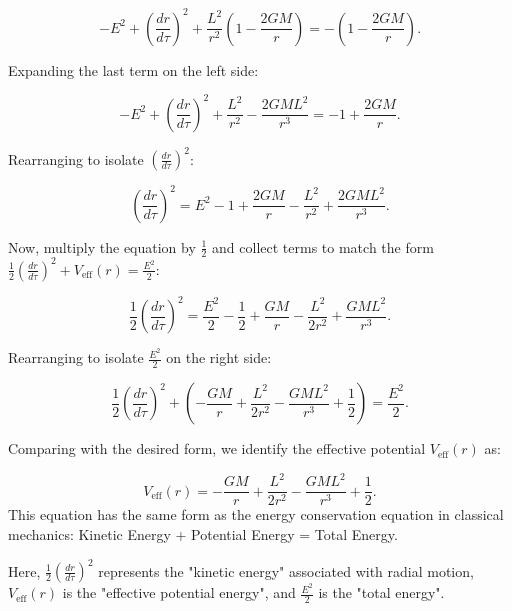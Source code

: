 \begin{equation}
-E^2 + \left( \frac{dr}{d\tau} \right)^2 + \frac{L^2}{r^2}\left( 1- \frac{2GM}{r} \right) = -\left( 1 - \frac{2GM}{r} \right).
\end{equation}

Expanding the last term on the left side:

\begin{equation}
-E^2 + \left( \frac{dr}{d\tau} \right)^2 + \frac{L^2}{r^2} - \frac{2GML^2}{r^3} = -1 + \frac{2GM}{r}.
\end{equation}

Rearranging to isolate $\left( \frac{dr}{d\tau} \right)^2$:

\begin{equation}
\left( \frac{dr}{d\tau} \right)^2 = E^2 - 1 + \frac{2GM}{r} - \frac{L^2}{r^2} + \frac{2GML^2}{r^3}.
\end{equation}

Now, multiply the equation by $\frac{1}{2}$ and collect terms to match the form $\frac{1}{2}\left(\frac{dr}{d\tau}\right)^2 + V_{\mathrm{eff}}(r) = \frac{E^2}{2}$:

\begin{equation}
\frac{1}{2}\left(\frac{dr}{d\tau}\right)^2 = \frac{E^2}{2} - \frac{1}{2} + \frac{GM}{r} - \frac{L^2}{2r^2} + \frac{GML^2}{r^3}.
\end{equation}

Rearranging to isolate $\frac{E^2}{2}$ on the right side:

\begin{equation}
\frac{1}{2}\left(\frac{dr}{d\tau}\right)^2 + \left(-\frac{GM}{r} + \frac{L^2}{2r^2} - \frac{GML^2}{r^3} + \frac{1}{2} \right) = \frac{E^2}{2}.
\end{equation}

Comparing with the desired form, we identify the effective potential $V_{\mathrm{eff}}(r)$ as:

\begin{equation}
V_{\mathrm{eff}}(r) = -\frac{GM}{r} + \frac{L^2}{2r^2} - \frac{GML^2}{r^3} + \frac{1}{2}.
\end{equation}
This equation has the same form as the energy conservation equation in classical mechanics:
Kinetic Energy + Potential Energy = Total Energy.

Here, $\frac{1}{2}\left(\frac{dr}{d\tau}\right)^2$ represents the "kinetic energy" associated with radial motion, $V_{\mathrm{eff}}(r)$ is the "effective potential energy", and $\frac{E^2}{2}$ is the "total energy".


